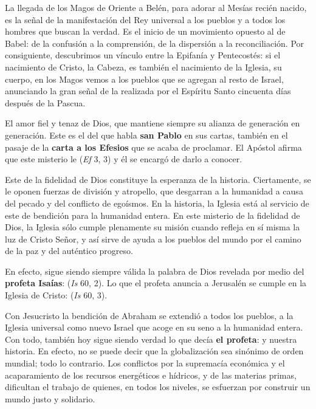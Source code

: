 \begin{body}
\begin{body}
{La llegada de los Magos de Oriente a Belén, para adorar al Mesías recién nacido, es la señal de la manifestación del Rey universal a los pueblos y a todos los hombres que buscan la verdad. Es el inicio de un movimiento opuesto al de Babel: de la confusión a la comprensión, de la dispersión a la reconciliación. Por consiguiente, descubrimos un vínculo entre la Epifanía y Pentecostés: si el nacimiento de Cristo, la Cabeza, es también el nacimiento de la Iglesia, su cuerpo, en los Magos vemos a los pueblos que se agregan al resto de Israel, anunciando la gran señal de la  realizada por el Espíritu Santo cincuenta días después de la Pascua.

El amor fiel y tenaz de Dios, que mantiene siempre su alianza de generación en generación. Este es el  del que habla \textbf{san Pablo} en sus cartas, también en el pasaje de la \textbf{carta a los Efesios} que se acaba de proclamar. El Apóstol afirma que este misterio le  (\emph{Ef} 3, 3) y él se encargó de darlo a conocer.

Este  de la fidelidad de Dios constituye la esperanza de la historia. Ciertamente, se le oponen fuerzas de división y atropello, que desgarran a la humanidad a causa del pecado y del conflicto de egoísmos. En la historia, la Iglesia está al servicio de este  de bendición para la humanidad entera. En este misterio de la fidelidad de Dios, la Iglesia sólo cumple plenamente su misión cuando refleja en sí misma la luz de Cristo Señor, y así sirve de ayuda a los pueblos del mundo por el camino de la paz y del auténtico progreso.

En efecto, sigue siendo siempre válida la palabra de Dios revelada por medio del \textbf{profeta Isaías}:  (\emph{Is} 60, 2). Lo que el profeta anuncia a Jerusalén se cumple en la Iglesia de Cristo:  (\emph{Is} 60, 3).

Con Jesucristo la bendición de Abraham se extendió a todos los pueblos, a la Iglesia universal como nuevo Israel que acoge en su seno a la humanidad entera. Con todo, también hoy sigue siendo verdad lo que decía \textbf{el profeta}:  y nuestra historia. En efecto, no se puede decir que la globalización sea sinónimo de orden mundial; todo lo contrario. Los conflictos por la supremacía económica y el acaparamiento de los recursos energéticos e hídricos, y de las materias primas, dificultan el trabajo de quienes, en todos los niveles, se esfuerzan por construir un mundo justo y solidario.

}
\end{body}
\end{body}
